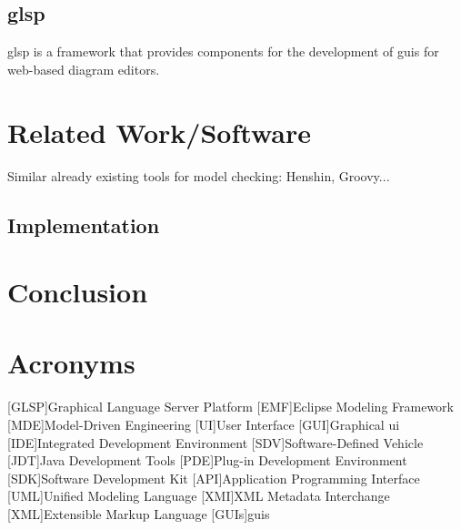 \documentclass[conference,onecolumn]{IEEEtran}
\begin{document}
  \subsection{\ac{glsp}}
  \label{subsec:glsp}

  \ac{glsp} is a framework that provides components for the development of \acsp{gui} for web-based diagram editors.
  \cite{glsp-repo}

  \section{Related Work/Software}
  \label{sec:related-work}

  Similar already existing tools for model checking: Henshin, Groovy...



  \subsection{Implementation}
  \label{subsec:implementation}


  \section{Conclusion}

  \printbibliography

  \newpage
  \section{Acronyms}
  \label{sec:acronyms}

  \begin{acronym}
    [GLSP]{Graphical Language Server Platform}
    [EMF]{Eclipse Modeling Framework}
    [MDE]{Model-Driven Engineering}
    [UI]{User Interface}
    [GUI]{Graphical \acf{ui}}
    [IDE]{Integrated Development Environment}
    [SDV]{Software-Defined Vehicle}
    [JDT]{Java Development Tools}
    [PDE]{Plug-in Development Environment}
    [SDK]{Software Development Kit}
    [API]{Application Programming Interface}
    [UML]{Unified Modeling Language}
    [XMI]{XML Metadata Interchange}
    [XML]{Extensible Markup Language}
    [GUIs]{\ac{gui}s}
  \end{acronym}
\end{document}
